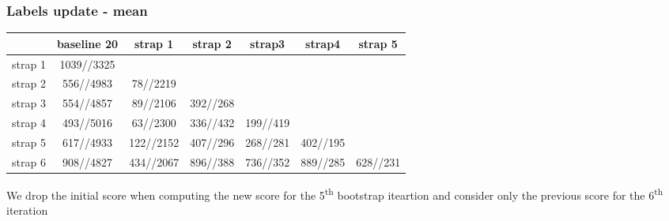 \documentclass[10pt]{article}
\newcommand{\1}{\mathbbm{1}}
\newcommand{\0}{\mathbf{0}}
\begin{document}
\subsubsection*{Labels update - mean}
\begin{table}[H]
    \centering
    \begin{tabular}{|c|c|c|c|c|c|c|}
    \hline
           & baseline 20     &  strap 1      & strap 2    &   strap3     &   strap4  & strap 5  \\
    \hline
    strap 1&    1039//3325   &               &            &              &           &          \\
    strap 2&     556//4983   &  78//2219     &            &              &           &          \\
    strap 3&     554//4857   &  89//2106     & 392//268   &              &           &          \\
    strap 4&     493//5016   &  63//2300     & 336//432   &   199//419   &           &          \\
    strap 5&     617//4933   &  122//2152    & 407//296   &   268//281   &  402//195 &          \\
    strap 6&     908//4827   &  434//2067    & 896//388   &   736//352   &  889//285 &  628//231\\
    \hline
    \end{tabular}
\end{table}
{\small We drop the initial score when computing the new score for the 5\textsuperscript{th} bootstrap iteartion and consider only the previous score for the 6\textsuperscript{th} iteration}
\end{document}
